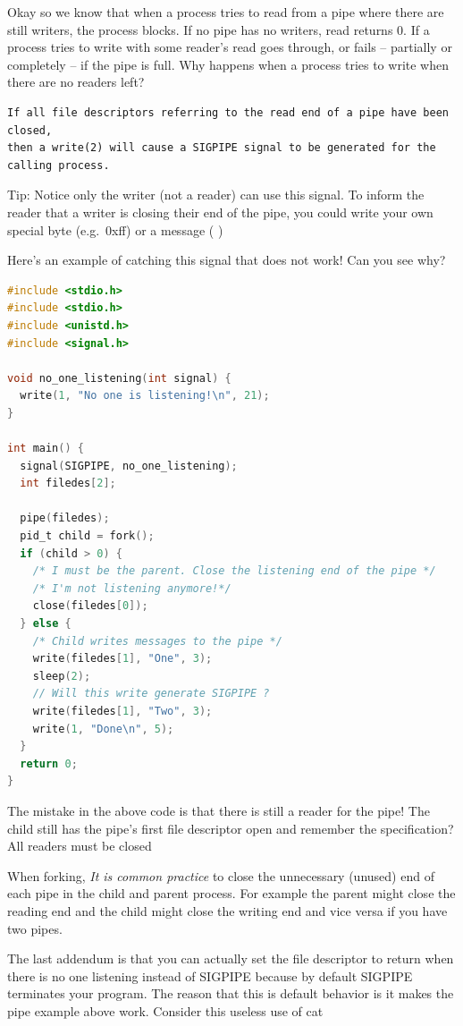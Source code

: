 Okay so we know that when a process tries to read from a pipe where there are still writers, the process blocks.
If no pipe has no writers, read returns 0.
If a process tries to write with some reader's read goes through, or fails -- partially or completely -- if the pipe is full.
Why happens when a process tries to write when there are no readers left?

\begin{verbatim}
If all file descriptors referring to the read end of a pipe have been closed,
then a write(2) will cause a SIGPIPE signal to be generated for the calling process.
\end{verbatim}

Tip: Notice only the writer (not a reader) can use this signal. To
inform the reader that a writer is closing their end of the pipe, you
could write your own special byte (e.g.~0xff) or a message (
)

Here's an example of catching this signal that does not work! Can you see why?

\begin{lstlisting}[language=C]
#include <stdio.h>
#include <stdio.h>
#include <unistd.h>
#include <signal.h>

void no_one_listening(int signal) {
  write(1, "No one is listening!\n", 21);
}

int main() {
  signal(SIGPIPE, no_one_listening);
  int filedes[2];

  pipe(filedes);
  pid_t child = fork();
  if (child > 0) {
    /* I must be the parent. Close the listening end of the pipe */
    /* I'm not listening anymore!*/
    close(filedes[0]);
  } else {
    /* Child writes messages to the pipe */
    write(filedes[1], "One", 3);
    sleep(2);
    // Will this write generate SIGPIPE ?
    write(filedes[1], "Two", 3);
    write(1, "Done\n", 5);
  }
  return 0;
}
\end{lstlisting}

The mistake in the above code is that there is still a reader for the pipe!
The child still has the pipe's first file descriptor open and remember the specification? All readers must be closed

When forking, \emph{It is common practice} to close the unnecessary (unused) end of each pipe in the child and parent process. For example the parent might close the reading end and the child might close the writing end and vice versa if you have two pipes.

The last addendum is that you can actually set the file descriptor to return when there is no one listening instead of SIGPIPE because by default SIGPIPE terminates your program.
The reason that this is default behavior is it makes the pipe example above work.
Consider this useless use of cat

